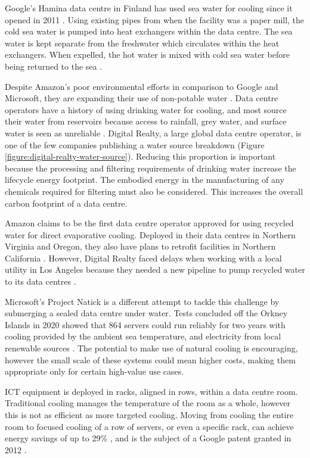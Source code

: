 \documentclass{article}
\begin{document}
Google's Hamina data centre in Finland has used sea water for cooling since it
opened in 2011 \cite{judge_google_2019}. Using existing pipes from when the
facility was a paper mill, the cold sea water is pumped into heat exchangers
within the data centre. The sea water is kept separate from the freshwater
which circulates within the heat exchangers. When expelled, the hot water is
mixed with cold sea water before being returned to the sea
\cite{levy_where_2012}.

Despite Amazon's poor environmental efforts in comparison to Google and
Microsoft, they are expanding their use of non-potable water
\cite{amazon_reducing_2019}. Data centre operators have a history of using
drinking water for cooling, and most source their water from reservoirs because
access to rainfall, grey water, and surface water is seen as unreliable
\cite{heslin_ignore_2016}. Digital Realty, a large global data centre operator,
is one of the few companies publishing a water source breakdown (Figure
\ref{figure:digital-realty-water-source}). Reducing this proportion is
important because the processing and filtering requirements of drinking water
increase the lifecycle energy footprint. The embodied energy in the
manufacturing of any chemicals required for filtering must also be considered.
This increases the overall carbon footprint of a data centre.

Amazon claims to be the first data centre operator approved for using recycled
water for direct evaporative cooling. Deployed in their data centres in
Northern Virginia and Oregon, they also have plans to retrofit facilities in
Northern California \cite{amazon_reducing_2019}. However, Digital Realty faced
delays when working with a local utility in Los Angeles because they needed a
new pipeline to pump recycled water to its data centres
\cite{fitzgerald_data_2015}.

Microsoft's Project Natick is a different attempt to tackle this challenge by
submerging a sealed data centre under water. Tests concluded off the Orkney
Islands in 2020 showed that 864 servers could run reliably for two years with
cooling provided by the ambient sea temperature, and electricity from local
renewable sources \cite{roach_microsoft_2020}. The potential to make use of
natural cooling is encouraging, however the small scale of these systems could
mean higher costs, making them appropriate only for certain high-value use
cases.

ICT equipment is deployed in racks, aligned in rows, within a data centre room.
Traditional cooling manages the temperature of the room as a whole, however
this is not as efficient as more targeted cooling. Moving from cooling the
entire room to focused cooling of a row of servers, or even a specific rack,
can achieve energy savings of up to 29\% \cite{moazamigoodarzi_influence_2019},
and is the subject of a Google patent granted in 2012
\cite{hamburgen_modular_2012}.
\end{document}
